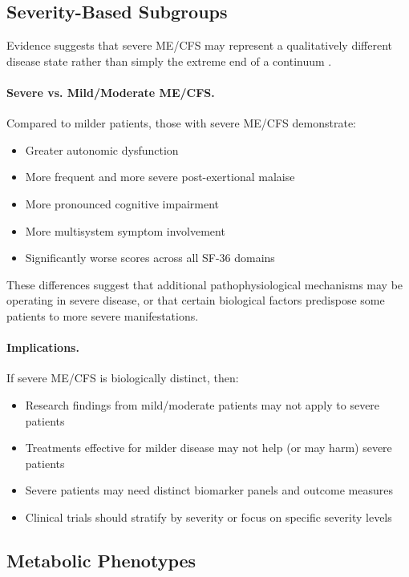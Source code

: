 \subsection{Severity-Based Subgroups}

Evidence suggests that severe ME/CFS may represent a qualitatively different disease state rather than simply the extreme end of a continuum \cite{Kingdon2020severe}.

\paragraph{Severe vs. Mild/Moderate ME/CFS.}
Compared to milder patients, those with severe ME/CFS demonstrate:
\begin{itemize}
    \item Greater autonomic dysfunction
    \item More frequent and more severe post-exertional malaise
    \item More pronounced cognitive impairment
    \item More multisystem symptom involvement
    \item Significantly worse scores across all SF-36 domains
\end{itemize}

These differences suggest that additional pathophysiological mechanisms may be operating in severe disease, or that certain biological factors predispose some patients to more severe manifestations.

\paragraph{Implications.}
If severe ME/CFS is biologically distinct, then:
\begin{itemize}
    \item Research findings from mild/moderate patients may not apply to severe patients
    \item Treatments effective for milder disease may not help (or may harm) severe patients
    \item Severe patients may need distinct biomarker panels and outcome measures
    \item Clinical trials should stratify by severity or focus on specific severity levels
\end{itemize}

\subsection{Metabolic Phenotypes}

